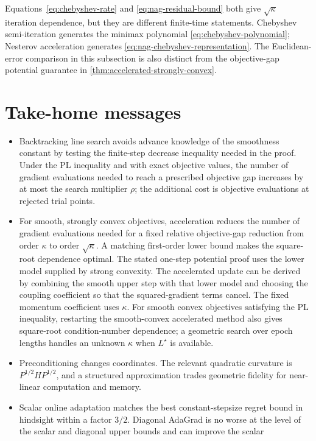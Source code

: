 \documentclass[11pt,twoside]{article}
\theoremstyle{definition}
\theoremstyle{remark}
\begin{document}
Equations~\eqref{eq:chebyshev-rate} and \eqref{eq:nag-residual-bound} both
give $\sqrt\kappa$ iteration dependence, but they are different finite-time
statements. Chebyshev semi-iteration generates the minimax polynomial
\cref{eq:chebyshev-polynomial}; Nesterov acceleration generates
\cref{eq:nag-chebyshev-representation}. The Euclidean-error comparison in
this subsection is also distinct from the objective-gap potential guarantee
in \cref{thm:accelerated-strongly-convex}.

\section{Take-home messages}
\label{sec:take-home}

\begin{itemize}[leftmargin=*]
\item Backtracking line search avoids advance knowledge of the smoothness
constant by testing the finite-step decrease inequality needed in the proof.
Under the PL inequality and with exact objective values, the number of
gradient evaluations needed to reach a prescribed objective gap increases by
at most the search multiplier $\rho$; the additional cost is objective
evaluations at rejected trial points.
\item For smooth, strongly convex objectives, acceleration reduces the number
of gradient evaluations needed for a fixed relative objective-gap reduction
from order $\kappa$ to order $\sqrt\kappa$. A matching first-order lower bound
makes the square-root dependence optimal. The stated one-step potential proof
uses the lower model supplied by strong convexity. The accelerated update can
be derived by combining the smooth upper step with that lower model and
choosing the coupling coefficient so that the squared-gradient terms cancel.
The fixed momentum coefficient uses $\kappa$. For smooth convex objectives
satisfying the PL inequality, restarting the smooth-convex accelerated method
also gives square-root condition-number dependence; a geometric search over
epoch lengths handles an unknown $\kappa$ when $L^\star$ is available.
\item Preconditioning changes coordinates. The relevant quadratic curvature
is $P^{1/2}HP^{1/2}$, and a structured approximation trades geometric
fidelity for near-linear computation and memory.
\item Scalar online adaptation matches the best constant-stepsize regret
bound in hindsight within a factor $3/2$. Diagonal AdaGrad is no worse at
the level of the scalar and diagonal upper bounds and can improve the scalar

\end{itemize}
\end{document}
